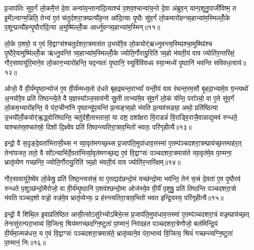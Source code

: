 प्र॒जाप॑तिः सुव॒र्गं लो॒कमै॒त्तं दे॒वा अन्वा॑य॒न्ताना॑दि॒त्याश्च॑ प॒शव॒श्चान्वा॑य॒न्ते दे॒वा अ॑ब्रुव॒न् यान्प॒शूनु॒पाजी॑विष्म॒ त इ॒मे᳚\-ऽन्वाग्म॒न्निति॒ तेभ्य॑ ए॒तं च॑तुर्दशरा॒त्रम्प्रत्यौ॑ह॒न्त आ॑दि॒त्याः पृ॒ष्ठैः सु॑व॒र्गं लो॒कमारो॑हन्त्र्य॒हाभ्या॑म॒स्मिल्लोँ॒के प॒शून्प्रत्यौ॑हन्पृ॒ष्ठैरा॑दि॒त्या अ॒मुष्मि॑ल्लोँ॒क आर्ध्नु॑वन्त्र्य॒हाभ्या॑म॒स्मिन्॥११॥

लो॒के प॒शवो॒ य ए॒वं वि॒द्वाꣳस॑श्चतुर्दशरा॒त्रमास॑त उ॒भयो॑रे॒व लो॒कयोर्॑ऋध्नुवन्त्य॒स्मिꣴश्चा॒मुष्मिꣴ॑श्च पृ॒ष्ठैरे॒वामुष्मि॑ल्लोँ॒क ऋ॑ध्नु॒वन्ति॑ त्र्य॒हाभ्या॑म॒स्मिल्लोँ॒के ज्योति॒र्गौरायु॒रिति॑ त्र्य॒हो भ॑वती॒यं वाव ज्योति॑र॒न्तरि॑क्षं॒ गौर॒सावायु॑रि॒माने॒व लो॒कान॒भ्यारो॑हन्ति॒ यद॒न्यतः॑ पृ॒ष्ठानि॒ स्युर्विवि॑वधꣴ स्या॒न्मध्ये॑ पृ॒ष्ठानि॑ भवन्ति सविवध॒त्वाय॑॥१२॥

ओजो॒ वै वी॒र्य॑म्पृ॒ष्ठान्योज॑ ए॒व वी॒र्य॑म्मध्य॒तो द॑धते बृहद्रथन्त॒रा\-भ्यां᳚ यन्ती॒यं वाव र॑थन्त॒रम॒सौ बृ॒हदा॒भ्यामे॒व य॒न्त्यथो॑ अ॒नयो॑रे॒व प्रति॑ तिष्ठन्त्ये॒ते वै य॒ज्ञस्या᳚ञ्ज॒साय॑नी स्रु॒ती ताभ्या॑मे॒व सु॑व॒र्गं लो॒कं य॑न्ति॒ परा᳚ञ्चो॒ वा ए॒ते सु॑व॒र्गं लो॒कम॒भ्यारो॑हन्ति॒ ये प॑रा॒चीना॑नि पृ॒ष्ठान्यु॑प॒यन्ति॑ प्र॒त्यङ्त्र्य॒हो भ॑वति प्र॒त्यव॑रूढ्या॒ अथो॒ प्रति॑ष्ठित्या उ॒भयो᳚र्लो॒कयोर्\mbox{}॑ऋ॒द्ध्वोत्ति॑ष्ठन्ति॒ चतु॑र्दशै॒तास्तासां॒ या दश॒ दशा᳚क्षरा वि॒राडन्नं॑ वि॒राड्वि॒राजै॒वान्नाद्य॒मव॑ रुन्धते॒ याश्चत॑स्र॒श्चत॑स्रो॒ दिशो॑ दि॒क्ष्वे॑व प्रति॑ तिष्ठन्त्यतिरा॒त्राव॒भितो॑ भवतः॒ परि॑गृहीत्यै॥१३॥

{\anuvakamend[{आर्ध्नु॑वन्त्र्य॒हाभ्या॑म॒स्मिन्थ्स॑विवध॒त्वाय॒ प्रति॑ष्ठित्या॒ एक॑त्रिꣳशच्च॥५॥}]}

इन्द्रो॒ वै स॒दृङ्दे॒वता॑भिरासी॒थ्स न व्या॒वृत॑मगच्छ॒थ्स प्र॒जाप॑ति॒मुपा॑धाव॒त्तस्मा॑ ए॒तम्प॑ञ्चदशरा॒त्रम्प्राय॑च्छ॒त्तमाह॑र॒त् तेना॑यजत॒ ततो॒ वै सो᳚\-ऽन्याभि॑र्दे॒वता॑भिर्व्या॒वृत॑मगच्छ॒द्य ए॒वं वि॒द्वाꣳसः॑ पञ्चदशरा॒त्रमास॑ते व्या॒वृत॑मे॒व पा॒प्मना॒ भ्रातृ॑व्येण गच्छन्ति॒ ज्योति॒र्गौरायु॒रिति॑ त्र्य॒हो भ॑वती॒यं वाव ज्योति॑र॒न्तरि॑क्षम्॥१४॥

गौर॒सावायु॑रे॒ष्वे॑व लो॒केषु॒ प्रति॑ तिष्ठ॒न्त्यस॑त्त्रं॒ वा ए॒तद्यद॑छन्दो॒मं यच्छ॑न्दो॒मा भव॑न्ति॒ तेन॑ स॒त्त्रं दे॒वता॑ ए॒व पृ॒ष्ठैरव॑ रुन्धते प॒शूञ्छ॑न्दो॒मैरोजो॒ वा वी॒र्य॑म्पृ॒ष्ठानि॑ प॒शव॑श्छन्दो॒मा ओज॑स्ये॒व वी॒र्ये॑ प॒शुषु॒ प्रति॑ तिष्ठन्ति पञ्चदशरा॒त्रो भ॑वति पञ्चद॒शो वज्रो॒ वज्र॑मे॒व भ्रातृ॑व्येभ्यः॒ प्र ह॑रन्त्यतिरा॒त्राव॒भितो॑ भवत इन्द्रि॒यस्य॒ परि॑गृहीत्यै॥१५॥

{\anuvakamend[{अ॒न्तरि॑क्षमिन्द्रि॒यस्यैक॑ञ्च॥६॥}]}

इन्द्रो॒ वै शि॑थि॒ल इ॒वाप्र॑तिष्ठित आसी॒त्सो\-ऽसु॑रेभ्यो\-ऽबिभे॒त्स प्र॒जाप॑ति॒मुपा॑धाव॒त्तस्मा॑ ए॒तम्प॑ञ्चदशरा॒त्रं वज्र॒म्प्राय॑च्छ॒त् तेनासु॑रान्परा॒भाव्य॑ वि॒जित्य॒ श्रिय॑मगच्छदग्नि॒ष्टुता॑ पा॒प्मानं॒ निर॑दहत पञ्चदशरा॒त्रेणौजो॒ बल॑मिन्द्रि॒यं वी॒र्य॑मा॒त्मन्न॑धत्त॒ य ए॒वं वि॒द्वाꣳसः॑ पञ्चदशरा॒त्रमास॑ते॒ भ्रातृ॑व्याने॒व प॑रा॒भाव्य॑ वि॒जित्य॒ श्रियं॑ गच्छन्त्यग्नि॒ष्टुता॑ पा॒प्मानं॒ निः॥१६॥

